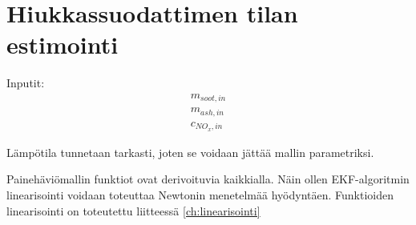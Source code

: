 \chapter{Hiukkassuodattimen tilan estimointi}%
\label{ch:dpf_estimointi}

Inputit:
\begin{align*}
    m_{soot, in}\\
    m_{ash, in}\\
    c_{NO_x, in}
\end{align*}

Lämpötila tunnetaan tarkasti, joten se voidaan jättää mallin parametriksi. 

Painehäviömallin funktiot ovat derivoituvia kaikkialla. Näin ollen EKF-algoritmin linearisointi voidaan toteuttaa Newtonin menetelmää hyödyntäen. Funktioiden linearisointi on toteutettu liitteessä \ref{ch:linearisointi}